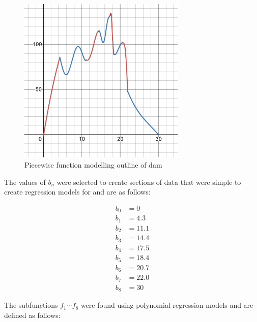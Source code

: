 \documentclass{article}
\theoremstyle{definition}
\begin{document}
        \begin{figure} %
            \centering
            \includegraphics[width = 8cm]{damFunction.pdf}
            \caption{Piecewise function modelling outline of dam}
            \label{figDamFunction}
        \end{figure}

        The values of $b_n$ were selected to create sections of data that were simple to create regression models for and are as follows:

        \begin{align*} %
            b_0 &= 0 \\
            b_1 &= 4.3 \\
            b_2 &= 11.1 \\
            b_3 &= 14.4 \\
            b_4 &= 17.5 \\
            b_5 &= 18.4 \\
            b_6 &= 20.7 \\
            b_7 &= 22.0 \\
            b_8 &= 30
        \end{align*}

        The subfunctions $f_1 \cdots f_8$ were found using polynomial regression models and are defined as follows:
\end{document}
